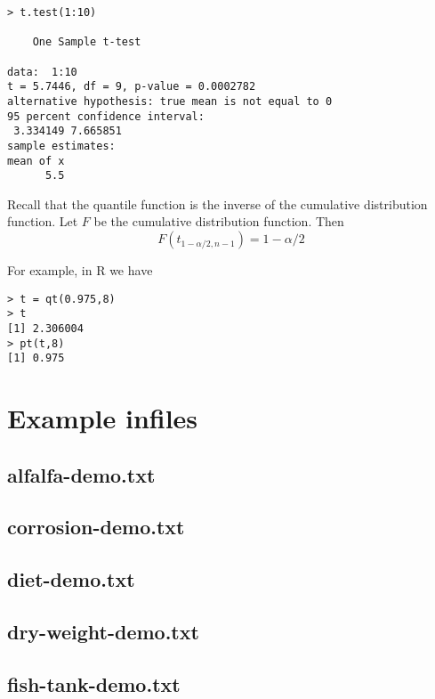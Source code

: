 \documentclass[12pt]{article}
\begin{document}
\begin{Verbatim}
> t.test(1:10)

	One Sample t-test

data:  1:10
t = 5.7446, df = 9, p-value = 0.0002782
alternative hypothesis: true mean is not equal to 0
95 percent confidence interval:
 3.334149 7.665851
sample estimates:
mean of x 
      5.5 
\end{Verbatim}

Recall that the quantile function
is the inverse of the cumulative
distribution function.
Let $F$ be the cumulative distribution function.
Then
\[
F(t_{1-\alpha/2,n-1})=1-\alpha/2
\]

For example, in R we have

\begin{Verbatim}
> t = qt(0.975,8)
> t
[1] 2.306004
> pt(t,8)
[1] 0.975
\end{Verbatim}

\newpage

\section{Example infiles}

\subsection{alfalfa-demo.txt}


\newpage
\subsection{corrosion-demo.txt}


\newpage
\subsection{diet-demo.txt}


\newpage
\subsection{dry-weight-demo.txt}


\newpage
\subsection{fish-tank-demo.txt}

\end{document}
